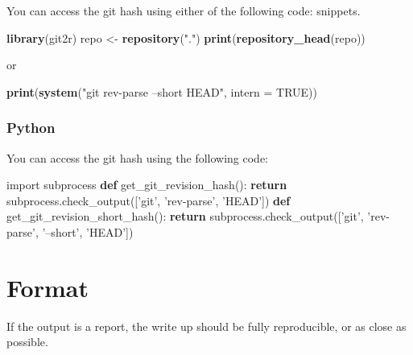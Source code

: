 \documentclass[]{book}
\newenvironment{Shaded}{\begin{snugshade}}{\end{snugshade}}
\newcommand{\ControlFlowTok}[1]{\textcolor[rgb]{0.13,0.29,0.53}{\textbf{#1}}}
\newcommand{\DataTypeTok}[1]{\textcolor[rgb]{0.13,0.29,0.53}{#1}}
\newcommand{\ImportTok}[1]{#1}
\newcommand{\KeywordTok}[1]{\textcolor[rgb]{0.13,0.29,0.53}{\textbf{#1}}}
\newcommand{\NormalTok}[1]{#1}
\newcommand{\OtherTok}[1]{\textcolor[rgb]{0.56,0.35,0.01}{#1}}
\newcommand{\StringTok}[1]{\textcolor[rgb]{0.31,0.60,0.02}{#1}}
\begin{document}
You can access the git hash using either of the following code:
snippets.

\begin{Shaded}
\begin{Highlighting}[]
\KeywordTok{library}\NormalTok{(git2r)}
\NormalTok{repo <-}\StringTok{ }\KeywordTok{repository}\NormalTok{(}\StringTok{"."}\NormalTok{)}
\KeywordTok{print}\NormalTok{(}\KeywordTok{repository_head}\NormalTok{(repo))}
\end{Highlighting}
\end{Shaded}

or

\begin{Shaded}
\begin{Highlighting}[]
\KeywordTok{print}\NormalTok{(}\KeywordTok{system}\NormalTok{(}\StringTok{"git rev-parse --short HEAD"}\NormalTok{, }\DataTypeTok{intern =} \OtherTok{TRUE}\NormalTok{))}
\end{Highlighting}
\end{Shaded}

\hypertarget{python}{%
\subsubsection*{Python}\label{python}}

You can access the git hash using the following code:

\begin{Shaded}
\begin{Highlighting}[]
\ImportTok{import}\NormalTok{ subprocess}
\KeywordTok{def}\NormalTok{ get_git_revision_hash():}
    \ControlFlowTok{return}\NormalTok{ subprocess.check_output([}\StringTok{'git'}\NormalTok{, }\StringTok{'rev-parse'}\NormalTok{, }\StringTok{'HEAD'}\NormalTok{])}
\KeywordTok{def}\NormalTok{ get_git_revision_short_hash():}
    \ControlFlowTok{return}\NormalTok{ subprocess.check_output([}\StringTok{'git'}\NormalTok{, }\StringTok{'rev-parse'}\NormalTok{, }\StringTok{'--short'}\NormalTok{, }\StringTok{'HEAD'}\NormalTok{])}
\end{Highlighting}
\end{Shaded}

\hypertarget{format}{%
\section{Format}\label{format}}

If the output is a report, the write up should be fully reproducible, or as close as possible.
\end{document}
